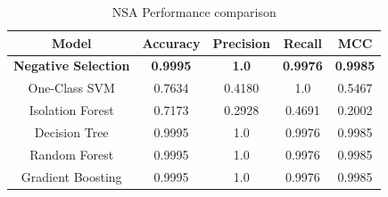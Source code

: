 \begin{table}[!h]
    \centering
    \begin{tabular}{ccccc}
    \hline
    Model              & Accuracy & Precision & Recall & MCC    \\ \hline
    \textbf{Negative Selection} & \textbf{0.9995}   & \textbf{1.0}       & \textbf{0.9976} & \textbf{0.9985} \\
    One-Class SVM      & 0.7634   & 0.4180    & 1.0    & 0.5467 \\
    Isolation Forest   & 0.7173   & 0.2928    & 0.4691 & 0.2002 \\
    Decision Tree      & 0.9995   & 1.0       & 0.9976 & 0.9985 \\
	Random Forest      & 0.9995   & 1.0       & 0.9976 & 0.9985 \\
    Gradient Boosting  & 0.9995   & 1.0       & 0.9976 & 0.9985 \\ \hline
    \end{tabular}
    \caption{NSA Performance comparison}
    \label{tab:ev_comparison}
\end{table}


